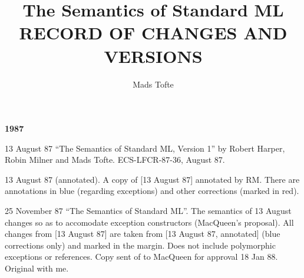 \title{The Semantics of Standard ML\\RECORD OF CHANGES AND VERSIONS}
\author{Mads Tofte}

\maketitle
\begin{center} \bf 1987 \end{center}
\vspace{1cm}
\begin{description}
\item{13 August 87} ``The Semantics of Standard ML, Version 1'' 
by Robert Harper, Robin Milner and Mads Tofte. ECS-LFCR-87-36,
August 87.

\item{13 August 87 (annotated).} A copy of [13 August 87]
annotated by RM. There are annotations in blue (regarding
exceptions) and other corrections (marked in red).  

\item{25 November 87} ``The Semantics of Standard ML''. The semantics
of 13 August changes so as to accomodate exception constructors  (MacQueen's
proposal).  
All changes from [13 August 87] are taken from [13 August 87,
annotated] (blue corrections only) and marked in the margin.
Does not include polymorphic exceptions or references. 
Copy sent of to MacQueen for approval 18 Jan 88. 
Original with me.
\end{description}

